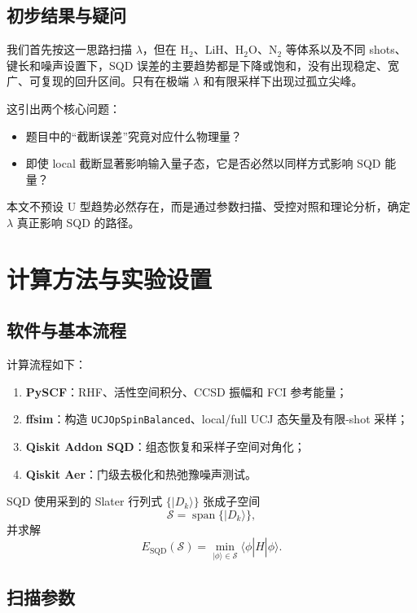 \documentclass[UTF8,12pt,a4paper]{ctexart}
\begin{document}
\subsection{初步结果与疑问}

我们首先按这一思路扫描 $\lambda$，但在 H$_2$、LiH、H$_2$O、N$_2$ 等体系以及不同 shots、键长和噪声设置下，SQD 误差的主要趋势都是下降或饱和，没有出现稳定、宽广、可复现的回升区间。只有在极端 $\lambda$ 和有限采样下出现过孤立尖峰。

这引出两个核心问题：
\begin{itemize}
  \item 题目中的“截断误差”究竟对应什么物理量？
  \item 即使 local 截断显著影响输入量子态，它是否必然以同样方式影响 SQD 能量？
\end{itemize}

本文不预设 U 型趋势必然存在，而是通过参数扫描、受控对照和理论分析，确定 $\lambda$ 真正影响 SQD 的路径。

\section{计算方法与实验设置}

\subsection{软件与基本流程}

计算流程如下：
\begin{enumerate}
  \item \textbf{PySCF}：RHF、活性空间积分、CCSD 振幅和 FCI 参考能量；
  \item \textbf{ffsim}：构造 \texttt{UCJOpSpinBalanced}、local/full UCJ 态矢量及有限-shot 采样；
  \item \textbf{Qiskit Addon SQD}：组态恢复和采样子空间对角化；
  \item \textbf{Qiskit Aer}：门级去极化和热弛豫噪声测试。
\end{enumerate}

SQD 使用采到的 Slater 行列式 $\{|D_k\rangle\}$ 张成子空间
\begin{equation}
\mathcal S=\operatorname{span}\{|D_k\rangle\},
\end{equation}
并求解
\begin{equation}
E_{\mathrm{SQD}}(\mathcal S)
=\min_{|\phi\rangle\in\mathcal S}
\langle\phi|\hat H|\phi\rangle.
\label{eq:sqd}
\end{equation}

\subsection{扫描参数}
\end{document}
